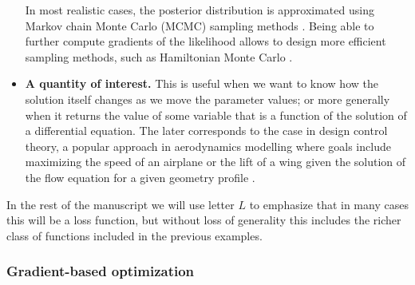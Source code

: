 \begin{itemize}
    In most realistic cases, the posterior distribution is approximated using Markov chain Monte Carlo (MCMC) sampling methods \cite{gelman2013bayesian}. 
    Being able to further compute gradients of the likelihood allows to design more efficient sampling methods, such as Hamiltonian Monte Carlo \cite{Betancourt_2017}.
    \item \textbf{A quantity of interest.} This is useful when we want to know how the solution itself changes as we move the parameter values; or more generally when it returns the value of some variable that is a function of the solution of a differential equation. The later corresponds to the case in design control theory, a popular approach in aerodynamics modelling where goals include maximizing the speed of an airplane or the lift of a wing given the solution of the flow equation for a given geometry profile \cite{Jameson_1988,Giles:2000wp,Mohammadi:2004dg}. 
\end{itemize}
In the rest of the manuscript we will use letter $L$ to emphasize that in many cases this will be a loss function, but without loss of generality this includes the richer class of functions included in the previous examples. 

\subsubsection{Gradient-based optimization}

